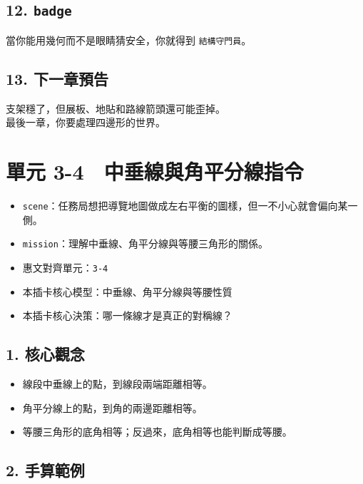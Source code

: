 \documentclass[
  chinese,
  12pt,
  a4paper,
  oneside]{article}
\providecommand{\tightlist}{%
  \setlength{\itemsep}{0pt}\setlength{\parskip}{0pt}}
\begin{document}
\subsection{\texorpdfstring{12.
\texttt{badge}}{12. badge}}\label{badge-3}

當你能用幾何而不是眼睛猜安全，你就得到 \texttt{結構守門員}。

\subsection{13. 下一章預告}\label{ux4e0bux4e00ux7ae0ux9810ux544a-3}

支架穩了，但展板、地貼和路線箭頭還可能歪掉。\\
最後一章，你要處理四邊形的世界。

\newpage

\section{單元
3-4　中垂線與角平分線指令}\label{ux55aeux5143-3-4-ux4e2dux5782ux7ddaux8207ux89d2ux5e73ux5206ux7ddaux6307ux4ee4}

\begin{itemize}
\tightlist
\item
  \texttt{scene}：任務局想把導覽地圖做成左右平衡的圖樣，但一不小心就會偏向某一側。
\item
  \texttt{mission}：理解中垂線、角平分線與等腰三角形的關係。
\item
  惠文對齊單元：\texttt{3-4}
\item
  本插卡核心模型：中垂線、角平分線與等腰性質
\item
  本插卡核心決策：哪一條線才是真正的對稱線？
\end{itemize}

\subsection{1. 核心觀念}\label{ux6838ux5fc3ux89c0ux5ff5-2}

\begin{itemize}
\tightlist
\item
  線段中垂線上的點，到線段兩端距離相等。
\item
  角平分線上的點，到角的兩邊距離相等。
\item
  等腰三角形的底角相等；反過來，底角相等也能判斷成等腰。
\end{itemize}

\subsection{2. 手算範例}\label{ux624bux7b97ux7bc4ux4f8b-5}
\end{document}
